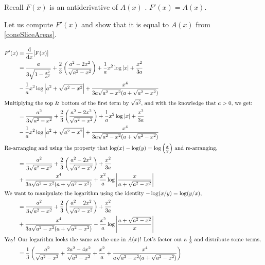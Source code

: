 \documentclass{exam}
\newcommand{\lr}[3]{\left#1{\mathstrut#3}\right#2}
\newcommand{\abs}[1]{\lr\vert\vert{#1}}
\begin{document}
\begin{questions}
\begin{parts}
\begin{solution}
    Recall $F(x)$ is an antiderivative of $A(x)$ . $F'(x) = A(x)$.

    Let us compute $F'(x)$ and show that it is equal to $A(x)$ from \ref{coneSliceAreas}.

    \begin{align*}
        F'(x) &= \frac{\mathrm d}{\mathrm dx} [F(x)] \\
              &= \frac{a}{3\sqrt{1 - \frac{x^2}{a^2}}} + \frac{2}{3}\left(\frac{a^2 - 2x^2}{\sqrt{a^2 - x^2}} \right) + \frac{1}{a}x^2 \log\abs{x} + \frac{x^2}{3a} \\
              &  - \frac{1}{a}x^2 \log\abs{a^2 + \sqrt{a^2 - x^2}} + \frac{x^4}{3a\sqrt{a^2 - x^2}(a + \sqrt{a^2 - x^2})} \\
              \intertext{Multiplying the top \& bottom of the first term by $\sqrt{a^2}$, and with the knowledge that $a > 0$, we get: }
              &= \frac{a^2}{3\sqrt{a^2 - x^2}} + \frac{2}{3}\left(\frac{a^2 - 2x^2}{\sqrt{a^2 - x^2}} \right) + \frac{1}{a}x^2 \log\abs{x} + \frac{x^2}{3a} \\
              &  - \frac{1}{a}x^2 \log\abs{a^2 + \sqrt{a^2 - x^2}} + \frac{x^4}{3a\sqrt{a^2 - x^2}(a + \sqrt{a^2 - x^2})} \\
              \intertext{Re-arranging and using the property that $\log(x) - \log(y) = \log\left( \frac{x}{y} \right)$ and re-arranging, }
              &= \frac{a^2}{3\sqrt{a^2 - x^2}} + \frac{2}{3}\left(\frac{a^2 - 2x^2}{\sqrt{a^2 - x^2}} \right) + \frac{x^2}{3a} \\
              &  + \frac{x^4}{3a\sqrt{a^2 - x^2}(a + \sqrt{a^2 - x^2})} + \frac{x^2}{a} \log\abs{\frac{x}{a + \sqrt{a^2 - x^2}}} \\
              \intertext{We want to manipulate the logarithm using the identity $-\log(x/y) = \log(y/x)$, }
              &= \frac{a^2}{3\sqrt{a^2 - x^2}} + \frac{2}{3}\left(\frac{a^2 - 2x^2}{\sqrt{a^2 - x^2}} \right) + \frac{x^2}{3a} \\
              &  + \frac{x^4}{3a\sqrt{a^2 - x^2}(a + \sqrt{a^2 - x^2})} - \frac{x^2}{a} \log\abs{\frac{a + \sqrt{a^2 - x^2}}{x}} \\
              \intertext{Yay! Our logarithm looks the same as the one in $A(x)$! Let's factor out a $\frac{1}{3}$ and distribute some terms, }
              &= \frac{1}{3} \left(
                    \frac{a^2}{\sqrt{a^2 - x^2}} + \frac{2a^2 - 4x^2}{\sqrt{a^2 - x^2}} + \frac{x^2}{a} + \frac{x^4}{a\sqrt{a^2 - x^2}(a + \sqrt{a^2 - x^2})}
              \right) \\

\end{align*}
\end{solution}
\end{parts}
\end{questions}
\end{document}
